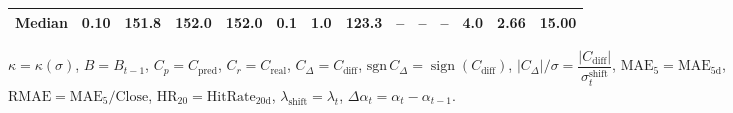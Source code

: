 \begin{threeparttable}
{\begin{tabular}{lrrrrrrrrrrrrr}
 Median &     0.10 & 151.8 & 152.0 & 152.0 &        0.1 &                      1.0 &               123.3 &         -- &        -- &             -- &              4.0 &            2.66 &                  15.00 \\
\bottomrule
\end{tabular}
}
\begin{tablenotes}\footnotesize
\item $\kappa=\kappa(\sigma)$, $B=B_{t-1}$, $C_p=C_{\text{pred}}$, $C_r=C_{\text{real}}$, $C_\Delta=C_{\text{diff}}$, $\mathrm{sgn}\,C_\Delta=\operatorname{sign}(C_{\text{diff}})$, $|C_\Delta|/\sigma=\dfrac{|C_{\text{diff}}|}{\sigma_t^{\text{shift}}}$, $\mathrm{MAE}_5=\mathrm{MAE}_{5\text{d}}$, $\mathrm{RMAE}= \mathrm{MAE}_5 / \text{Close}$, $\mathrm{HR}_{20}=\mathrm{HitRate}_{20\text{d}}$, 
$\lambda_{\text{shift}}=\lambda_t$, 
$\Delta\alpha_t=\alpha_t-\alpha_{t-1}$.
\end{tablenotes}
\end{threeparttable}
\endgroup
